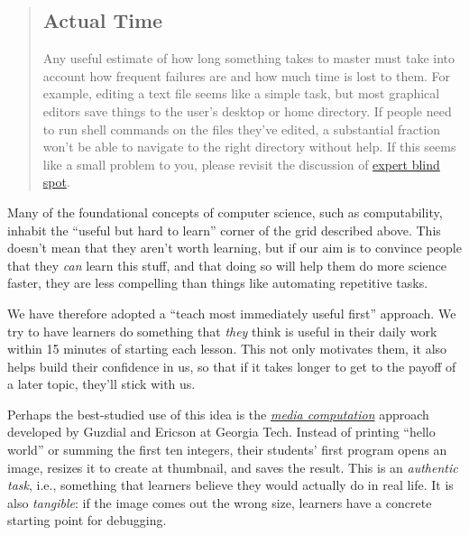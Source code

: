 \begin{quotation}   %
\subsection*{Actual Time}

Any useful estimate of how long something takes to master must take into account
how frequent failures are
and how much time is lost to them.
For example,
editing a text file seems like a simple task,
but most graphical editors save things to the user's desktop or home directory.
If people need to run shell commands on the files they've edited,
a substantial fraction won't be able to navigate to the right directory without help.
If this seems like a small problem to you,
please revisit the discussion of \href{\{\{ page.root \}\}/08-memory/}{expert blind spot}.
\end{quotation}   %

Many of the foundational concepts of computer science,
such as computability,
inhabit the ``useful but hard to learn'' corner of the grid described above.
This doesn't mean that they aren't worth learning,
but if our aim is to convince people that they \emph{can} learn this stuff,
and that doing so will help them do more science faster,
they are less compelling than things like automating repetitive tasks.

We have therefore adopted a ``teach most immediately useful first'' approach.
We try to have learners do something that \emph{they} think is useful in their daily work
within 15 minutes of starting each lesson.
This not only motivates them,
it also helps build their confidence in us,
so that if it takes longer to get to the payoff of a later topic,
they'll stick with us.

Perhaps the best-studied use of this idea is
the \emph{\href{\{\{ page.root \}\}/files/papers/guzdial-mediacomp-retrospective-2013.pdf}{media computation}} approach
developed by Guzdial and Ericson at Georgia Tech.
Instead of printing ``hello world'' or summing the first ten integers,
their students' first program opens an image,
resizes it to create at thumbnail,
and saves the result.
This is an \emph{authentic task},
i.e.,
something that learners believe they would actually do in real life.
It is also \emph{tangible}:
if the image comes out the wrong size,
learners have a concrete starting point for debugging.

